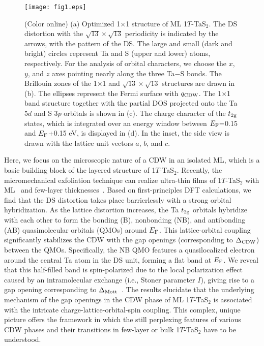 \documentclass[aps,prl,twocolumn,showpacs,byrevtex]{revtex4}
\begin{document}
\begin{figure}[h!t]
\texttt{[image: fig1.eps]}
\caption{(Color online) (a) Optimized 1${\times}$1 structure of ML 1$T$-TaS$_2$. The DS distortion with the ${\sqrt{13}}{\times}{\sqrt{13}}$ periodicity is indicated by the arrows, with the pattern of the DS. The large and small (dark and bright) circles represent Ta and S (upper and lower) atoms, respectively. For the analysis of orbital characters, we choose the $x$, $y$, and $z$ axes pointing nearly along the three Ta$-$S bonds. The Brillouin zones of the 1${\times}$1 and ${\sqrt{13}}{\times}{\sqrt{13}}$ structures are drawn in (b). The ellipses represent the Fermi surface with $q_{\rm CDW}$. The 1${\times}$1 band structure together with the partial DOS projected onto the Ta 5$d$ and S 3$p$ orbitals is shown in (c). The charge character of the $t_{\rm 2g}$ states, which is integrated over an energy window between $E_{\rm F}-$0.15 and $E_{\rm F}$+0.15 eV, is displayed in (d). In the inset, the side view is drawn with the lattice unit vectors $a$, $b$, and $c$.}
\label{figure:1}
\end{figure}

Here, we focus on the microscopic nature of a CDW in an isolated ML, which is a basic building block of the layered structure of 1$T$-TaS$_2$. Recently, the micromechanical exfoliation technique can realize ultra-thin films of 1$T$-TaS$_2$ with ML~\cite{Albert} and few-layer thicknesses~\cite{Tsen}. Based on first-principles DFT calculations, we find that the DS distortion takes place barrierlessly with a strong orbital hybridization. As the lattice distortion increases, the Ta $t_{\rm 2g}$ orbitals hybridize with each other to form the bonding (B), nonbonding (NB), and antibonding (AB) quasimolecular orbitals (QMOs) around $E_{\rm F}$. This lattice-orbital coupling significantly stabilizes the CDW with the gap openings (corresponding to ${\Delta}_{\rm CDW}$) between the QMOs. Specifically, the NB QMO features a quasilocalized electron around the central Ta atom in the DS unit, forming a flat band at $E_{\rm F}$. We reveal that this half-filled band is spin-polarized due to the local polarization effect caused by an intramolecular exchange (i.e., Stoner parameter $I$), giving rise to a gap opening corresponding to ${\Delta}_{\rm Mott}$~\cite{severin-prl93}. The results elucidate that the underlying mechanism of the gap openings in the CDW phase of ML 1$T$-TaS$_2$ is associated with the intricate charge-lattice-orbital-spin coupling. This complex, unique picture offers the framework in which the still perplexing features of various CDW phases and their transitions in few-layer or bulk 1$T$-TaS$_2$ have to be understood.
\end{document}
